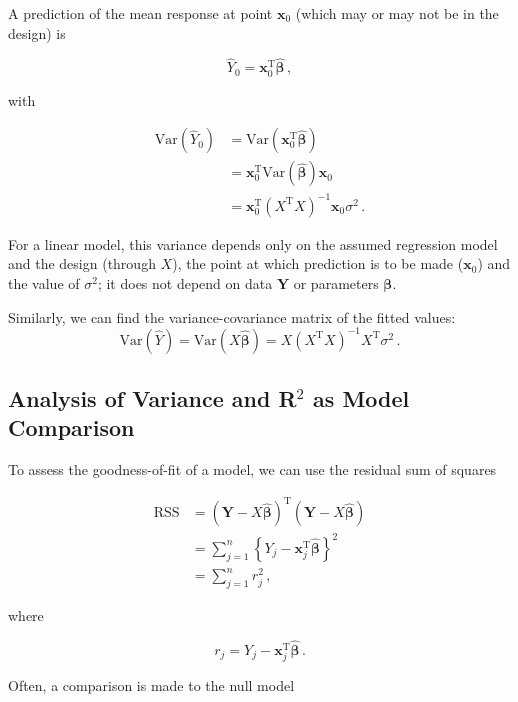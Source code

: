\documentclass[
]{book}
\theoremstyle{definition}
\theoremstyle{definition}
\theoremstyle{definition}
\theoremstyle{definition}
\theoremstyle{remark}
\begin{document}
A prediction of the mean response at point \(\boldsymbol{x}_0\) (which may or may not be in the design) is

\[
\hat{Y}_0 = \boldsymbol{x}_0^{\textrm{T}}\hat{\boldsymbol{\beta}}\,,
\]

with

\begin{align*}
\textrm{Var}(\hat{Y}_0) & = \textrm{Var}\left(\boldsymbol{x}_0^{\textrm{T}}\hat{\boldsymbol{\beta}}\right) \\
& = \boldsymbol{x}_0^{\textrm{T}}\textrm{Var}(\hat{\boldsymbol{\beta}})\boldsymbol{x}_0 \\
& = \boldsymbol{x}_0^{\textrm{T}}(X^{\textrm{T}}X)^{-1}\boldsymbol{x}_0\sigma^{2}\,.
\end{align*}

For a linear model, this variance depends only on the assumed regression model and the design (through \(X\)), the point at which prediction is to be made (\(\boldsymbol{x}_0\)) and the value of \(\sigma^2\); it does not depend on data \(\boldsymbol{Y}\) or parameters \(\boldsymbol{\beta}\).

Similarly, we can find the variance-covariance matrix of the fitted values:
\[
\textrm{Var}(\hat{Y})=\textrm{Var}(X\hat{\boldsymbol{\beta}})=X(X^{\textrm{T}}X)^{-1}X^{\textrm{T}}\sigma^{2}\,.
\]

\hypertarget{anova-revision}{%
\subsection{\texorpdfstring{Analysis of Variance and R\(^{2}\) as Model Comparison}{Analysis of Variance and R\^{}\{2\} as Model Comparison}}\label{anova-revision}}

To assess the goodness-of-fit of a model, we can use the residual sum of squares

\begin{align*}
\textrm{RSS} & = (\boldsymbol{Y} - X\hat{\boldsymbol{\beta}})^{\textrm{T}} (\boldsymbol{Y} - X\hat{\boldsymbol{\beta}})\\
& = \sum^{n}_{j=1}\left\{Y_{j}-\boldsymbol{x}_{j}^{\textrm{T}}\hat{\boldsymbol{\beta}}\right\}^{2}\\
& = \sum^{n}_{j=1}r_{j}^{2}\,,
\end{align*}

where

\[
r_{j}=Y_{j}-\boldsymbol{x}_{j}^{\textrm{T}}\hat{\boldsymbol{\beta}}\,.
\]

Often, a comparison is made to the null model
\end{document}

